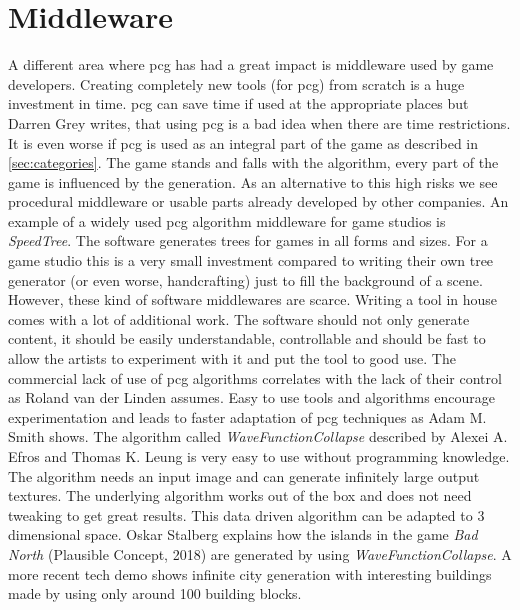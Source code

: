 \documentclass[10pt,a4paper]{article}
\begin{document}
\section{Middleware}\label{sec:Middleware}
\begin{multicols}{2}
A different area where \gls{pcg} has had a great impact is middleware used by game developers. Creating completely new tools (for \gls{pcg}) from scratch is a huge investment in time. \gls{pcg} can save time if used at the appropriate places but Darren Grey writes, that using \gls{pcg} is a bad idea when there are time restrictions\citep[p.~6]{Short:2017:PGG:3161477}. It is even worse if \gls{pcg} is used as an integral part of the game as described in \autoref{sec:categories}. The game stands and falls with the algorithm, every part of the game is influenced by the generation. As an alternative to this high risks we see procedural middleware or usable parts already developed by other companies. An example of a widely used \gls{pcg} algorithm middleware for game studios is \textit{SpeedTree}\cite{SpeedTree}. The software generates trees for games in all forms and sizes. For a game studio this is a very small investment compared to writing their own tree generator (or even worse, handcrafting) just to fill the background of a scene. However, these kind of software middlewares are scarce. Writing a tool in house comes with a lot of additional work. The software should not only generate content, it should be easily understandable, controllable and should be fast to allow the artists to experiment with it and put the tool to good use. The commercial lack of use of \gls{pcg} algorithms correlates with the lack of their control as Roland van der Linden assumes\cite{VanderLinden2014}. Easy to use tools and algorithms encourage experimentation and leads to faster adaptation of \gls{pcg} techniques as Adam M. Smith shows\cite{Karth2017}. The algorithm called \textit{WaveFunctionCollapse} described by Alexei A. Efros and Thomas K. Leung is very easy to use without programming knowledge\cite{Efros1999}. The algorithm needs an input image and can generate infinitely large output textures. The underlying algorithm works out of the box and does not need tweaking to get great results. This data driven algorithm can be adapted to 3 dimensional space. Oskar Stalberg explains how the islands in the game \textit{Bad North} (Plausible Concept, 2018) are generated by using \textit{WaveFunctionCollapse}. A more recent tech demo shows infinite city generation with interesting buildings made by using only around 100 building blocks\cite{Marian2019}.
\end{multicols}
\end{document}
